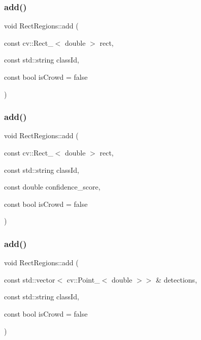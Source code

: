 \subsubsection{\texorpdfstring{add()}{add()}\hspace{0.1cm}{\footnotesize\ttfamily [1/5]}}
{\footnotesize\ttfamily void Rect\+Regions\+::add (\begin{DoxyParamCaption}\item[{const cv\+::\+Rect\+\_\+$<$ double $>$}]{rect,  }\item[{const std\+::string}]{class\+Id,  }\item[{const bool}]{is\+Crowd = {\ttfamily false} }\end{DoxyParamCaption})}

\mbox{\label{struct_rect_regions_afebb1d6079ae2d0701b70c3c153a4a88}} 
\subsubsection{\texorpdfstring{add()}{add()}\hspace{0.1cm}{\footnotesize\ttfamily [2/5]}}
{\footnotesize\ttfamily void Rect\+Regions\+::add (\begin{DoxyParamCaption}\item[{const cv\+::\+Rect\+\_\+$<$ double $>$}]{rect,  }\item[{const std\+::string}]{class\+Id,  }\item[{const double}]{confidence\+\_\+score,  }\item[{const bool}]{is\+Crowd = {\ttfamily false} }\end{DoxyParamCaption})}

\mbox{\label{struct_rect_regions_a00afed1e298d77dd9dd722e590507586}} 
\subsubsection{\texorpdfstring{add()}{add()}\hspace{0.1cm}{\footnotesize\ttfamily [3/5]}}
{\footnotesize\ttfamily void Rect\+Regions\+::add (\begin{DoxyParamCaption}\item[{const std\+::vector$<$ cv\+::\+Point\+\_\+$<$ double $>$$>$ \&}]{detections,  }\item[{const std\+::string}]{class\+Id,  }\item[{const bool}]{is\+Crowd = {\ttfamily false} }\end{DoxyParamCaption})}

